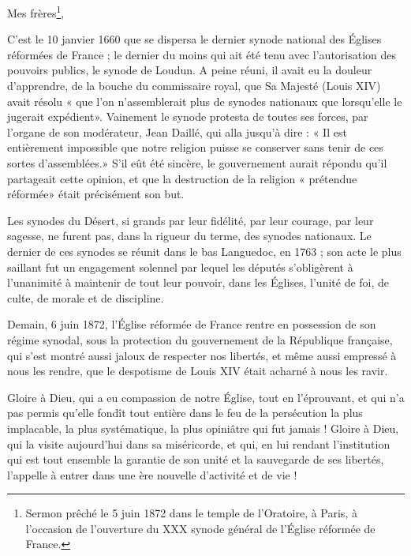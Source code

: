 
Mes frères\footnote{Sermon prêché le 5 juin 1872 dans le temple de l’Oratoire, à Paris, à l’occasion de l'ouverture du XXX synode général de l'Église réformée de France.},

C’est le 10 janvier 1660 que se dispersa le dernier synode national des Églises réformées de France ; le dernier du moins qui ait été tenu avec l’autorisation des pouvoirs publics, le synode de Loudun. A peine réuni, il avait eu la douleur d’apprendre, de la bouche du commissaire royal, que Sa Majesté (Louis XIV) avait résolu « que l’on n’assemblerait plus de synodes nationaux que lorsqu’elle le jugerait expédient». Vainement le synode protesta de toutes ses forces, par l’organe de son modérateur, Jean Daillé, qui alla jusqu’à dire : « Il est entièrement impossible que notre religion puisse se conserver sans tenir de ces sortes d’assemblées.» S’il eût été sincère, le gouvernement aurait répondu qu’il partageait cette opinion, et que la destruction de la religion « prétendue réformée» était précisément son but.

Les synodes du Désert, si grands par leur fidélité, par leur courage, par leur sagesse, ne furent pas, dans la rigueur du terme, des synodes nationaux. Le dernier de ces synodes se réunit dans le bas Languedoc, en 1763 ; son acte le plus saillant fut un engagement solennel par lequel les députés s’obligèrent à l’unanimité à maintenir de tout leur pouvoir, dans les Églises, l’unité de foi, de culte, de morale et de discipline.

Demain, 6 juin 1872, l’Église réformée de France rentre en possession de son régime synodal, sous la protection du gouvernement de la République française, qui s’est montré aussi jaloux de respecter nos libertés, et même aussi empressé à nous les rendre, que le despotisme de Louis XIV était acharné à nous les ravir.

Gloire à Dieu, qui a eu compassion de notre Église, tout en l’éprouvant, et qui n’a pas permis qu’elle fondît tout entière dans le feu de la persécution la plus implacable, la plus systématique, la plus opiniâtre qui fut jamais ! Gloire à Dieu, qui la visite aujourd’hui dans sa miséricorde, et qui, en lui rendant l’institution qui est tout ensemble la garantie de son unité et la sauvegarde de ses libertés, l’appelle à entrer dans une ère nouvelle d’activité et de vie !

